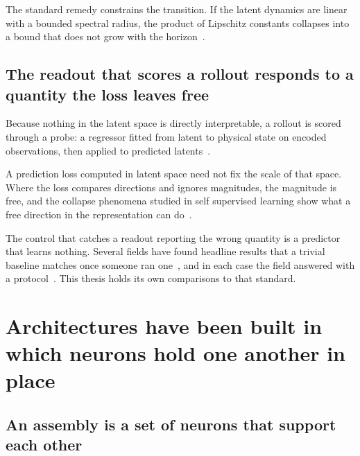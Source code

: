 The standard remedy constrains the transition. If the latent dynamics are
linear with a bounded spectral radius, the product of Lipschitz constants
collapses into a bound that does not grow with the
horizon~\cite{lusch_deep_2018, azencot_forecasting_2020, mamakoukas_memory_2020}.

\subsection{The readout that scores a rollout responds to a quantity the loss leaves free}
\label{sec:bg_scoring}

Because nothing in the latent space is directly interpretable, a rollout is
scored through a probe: a regressor fitted from latent to physical state on
encoded observations, then applied to predicted
latents~\cite{belinkov_probing_2022, hewitt_designing_2019}.

A prediction loss computed in latent space need not fix the scale of that
space. Where the loss compares directions and ignores magnitudes, the
magnitude is free, and the collapse phenomena studied in self supervised
learning show what a free direction in the representation can
do~\cite{grill_bootstrap_2020, chen_exploring_2021, jing_understanding_2022}.

The control that catches a readout reporting the wrong quantity is a predictor
that learns nothing. Several fields have found headline results that a trivial
baseline matches once someone ran
one~\cite{ferraridacrema_really_2019, musgrave_metric_2020, lin_neural_2019}, and in
each case the field answered with a protocol~\cite{henderson_deep_2018}. This
thesis holds its own comparisons to that standard.


\section{Architectures have been built in which neurons hold one another in place}
\label{sec:bg_substrate}

\subsection{An assembly is a set of neurons that support each other}
\label{sec:bg_assemblies}

